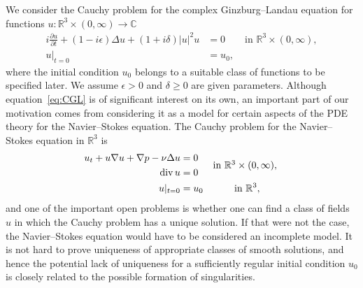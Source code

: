 \documentclass[11pt]{article}
\renewcommand{\div}{\,{\rm div}\,}
\newcommand{\RR}{\mathbb R}
\begin{document}
We consider the Cauchy problem for the complex Ginzburg--Landau
equation for functions
\(u\colon \RR^{3}\times (0,\infty)\to \mathbb{C}\)
\begin{equation}\label{eq:CGL}
  \begin{split}
    i \frac{\partial u}{\partial t} + (1 - i\epsilon)\Delta u + (1 + i\delta)|u|^{2}u &= 0 \qquad\text{in }\mathbb{R}^{3} \times (0, \infty),\\
    u|_{t=0} &= u_{0},
  \end{split}
\end{equation}
where the initial condition \(u_0\) belongs to a suitable class of
functions to be specified later. We assume \(\epsilon>0\) and
\(\delta\ge0\) are given parameters. Although equation~\eqref{eq:CGL}
is of significant interest on its own, an important part of our
motivation comes from considering it as a model for certain aspects of
the PDE theory for the Navier--Stokes equation. The Cauchy problem for
the Navier--Stokes equation in \(\RR^{3}\) is
\begin{equation}\label{V-I-2}
  \begin{aligned}
    u_t+u\nabla u+\nabla p-\nu\Delta u &=0\\
    \div u &=0
           &\smash{\raisebox{.5\baselineskip}
             {\(\text{in }\RR^3\times(0,\infty),\)}}\,\\
    u|_{t=0}&=u_0
           &\text{in }\RR^3,\phantom{mm}
  \end{aligned}
\end{equation}
and one of the important open problems is whether one can find a class
of fields \(u\) in which the Cauchy problem has a unique solution. If
that were not the case, the Navier--Stokes equation would have to be
considered an incomplete model. It is not hard to prove uniqueness of
appropriate classes of smooth solutions, and hence the potential lack
of uniqueness for a sufficiently regular initial condition \(u_0\) is
closely related to the possible formation of singularities.
\end{document}
